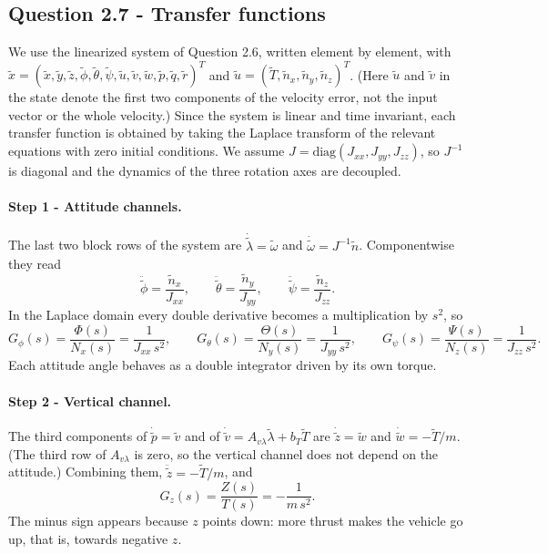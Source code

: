 \subsection*{Question 2.7 - Transfer functions}

We use the linearized system of Question 2.6, written element by element, with $\tilde x = (\tilde x, \tilde y, \tilde z, \tilde\phi, \tilde\theta, \tilde\psi, \tilde u, \tilde v, \tilde w, \tilde p, \tilde q, \tilde r)^T$ and $\tilde u = (\tilde T, \tilde n_x, \tilde n_y, \tilde n_z)^T$.
(Here $\tilde u$ and $\tilde v$ in the state denote the first two components of the velocity error, not the input vector or the whole velocity.)
Since the system is linear and time invariant, each transfer function is obtained by taking the Laplace transform of the relevant equations with zero initial conditions.
We assume $J = \mathrm{diag}(J_{xx}, J_{yy}, J_{zz})$, so $J^{-1}$ is diagonal and the dynamics of the three rotation axes are decoupled.

\paragraph{Step 1 - Attitude channels.}
The last two block rows of the system are $\dot{\tilde\lambda} = \tilde\omega$ and $\dot{\tilde\omega} = J^{-1}\tilde n$.
Componentwise they read
\begin{equation*}
\ddot{\tilde\phi} = \frac{\tilde n_x}{J_{xx}}, \qquad
\ddot{\tilde\theta} = \frac{\tilde n_y}{J_{yy}}, \qquad
\ddot{\tilde\psi} = \frac{\tilde n_z}{J_{zz}} .
\end{equation*}
In the Laplace domain every double derivative becomes a multiplication by $s^2$, so
\begin{equation*}
G_\phi(s) = \frac{\Phi(s)}{N_x(s)} = \frac{1}{J_{xx}\, s^2}, \qquad
G_\theta(s) = \frac{\Theta(s)}{N_y(s)} = \frac{1}{J_{yy}\, s^2}, \qquad
G_\psi(s) = \frac{\Psi(s)}{N_z(s)} = \frac{1}{J_{zz}\, s^2}.
\end{equation*}
Each attitude angle behaves as a double integrator driven by its own torque.

\paragraph{Step 2 - Vertical channel.}
The third components of $\dot{\tilde p} = \tilde v$ and of $\dot{\tilde v} = A_{v\lambda}\tilde\lambda + b_T\tilde T$ are $\dot{\tilde z} = \tilde w$ and $\dot{\tilde w} = -\tilde T/m$.
(The third row of $A_{v\lambda}$ is zero, so the vertical channel does not depend on the attitude.)
Combining them, $\ddot{\tilde z} = -\tilde T / m$, and
\begin{equation*}
G_z(s) = \frac{Z(s)}{T(s)} = -\frac{1}{m\, s^2}.
\end{equation*}
The minus sign appears because $z$ points down: more thrust makes the vehicle go up, that is, towards negative $z$.

